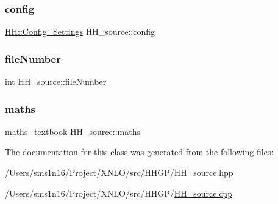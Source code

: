 \subsubsection{\texorpdfstring{config}{config}}
{\footnotesize\ttfamily \hyperlink{class_h_h_1_1_config___settings}{H\+H\+::\+Config\+\_\+\+Settings} H\+H\+\_\+source\+::config\hspace{0.3cm}{\ttfamily [private]}}

\mbox{\label{class_h_h__source_a6631481cc1bea05ab564cb1841644a12}} 
\subsubsection{\texorpdfstring{file\+Number}{fileNumber}}
{\footnotesize\ttfamily int H\+H\+\_\+source\+::file\+Number\hspace{0.3cm}{\ttfamily [private]}}

\mbox{\label{class_h_h__source_a93637ad30af846dd04eb741437114f8f}} 
\subsubsection{\texorpdfstring{maths}{maths}}
{\footnotesize\ttfamily \hyperlink{classmaths__textbook}{maths\+\_\+textbook} H\+H\+\_\+source\+::maths\hspace{0.3cm}{\ttfamily [private]}}



The documentation for this class was generated from the following files\+:\begin{DoxyCompactItemize}
\item 
/\+Users/sms1n16/\+Project/\+X\+N\+L\+O/src/\+H\+H\+G\+P/\hyperlink{_h_h__source_8hpp}{H\+H\+\_\+source.\+hpp}\item 
/\+Users/sms1n16/\+Project/\+X\+N\+L\+O/src/\+H\+H\+G\+P/\hyperlink{_h_h__source_8cpp}{H\+H\+\_\+source.\+cpp}\end{DoxyCompactItemize}
